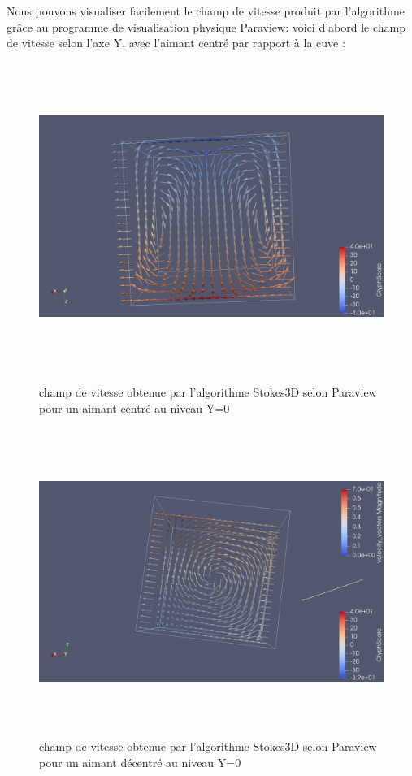\documentclass[a4paper,12pt,titlepage]{report}
\begin{document}
\begin{onehalfspace}
Nous pouvons visualiser facilement le champ de vitesse produit par l'algorithme grâce au programme de visualisation physique Paraview: 
voici d'abord le champ de vitesse selon l'axe Y, avec l'aimant centré par rapport à la cuve : 
\begin{figure}[!h]
\includegraphics[height = 10cm, keepaspectratio]{graphes/Champ_de_vitesse_selon_Y_centre.png} 
\caption{\label{figure 3 } champ de vitesse obtenue par l'algorithme Stokes3D selon Paraview pour un aimant centré au niveau Y=0}
\includegraphics[height = 10cm, keepaspectratio]{graphes/Champ_de_vitesse_selon_Y.png} 
\caption{\label{figure 3 } champ de vitesse obtenue par l'algorithme Stokes3D selon Paraview pour un aimant décentré au niveau Y=0}



\end{figure}
\end{onehalfspace}
\end{document}
